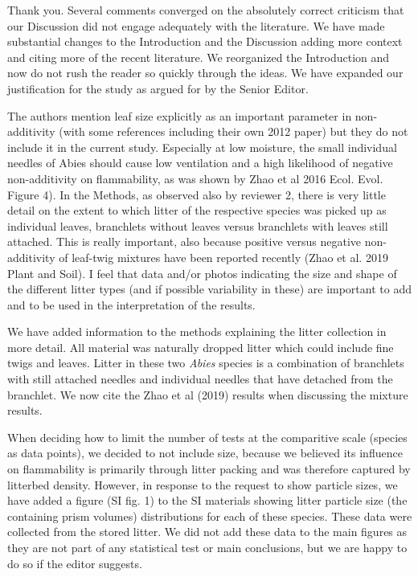 \documentclass[letterpaper, 12pt]{letter}
\begin{document}
\begin{letter}{}
Thank you. Several comments converged on the absolutely correct criticism that
our Discussion did not engage adequately with the literature. We have made
substantial changes to the Introduction and the Discussion adding more context
and citing more of the recent literature. We reorganized the Introduction and
now do not rush the reader so quickly through the ideas. We have expanded our
justification for the study as argued for by the Senior Editor.


\begin{quoting}
  The authors mention leaf size explicitly as an important parameter in
  non-additivity (with some references including their own 2012 paper) but they
  do not include it in the current study. Especially at low moisture, the small
  individual needles of Abies should cause low ventilation and a high
  likelihood of negative non-additivity on flammability, as was shown by Zhao
  et al 2016 Ecol. Evol. Figure 4). In the Methods, as observed also by
  reviewer 2, there is very little detail on the extent to which litter of the
  respective species was picked up as individual leaves, branchlets without
  leaves versus branchlets with leaves still attached. This is really
  important, also because positive versus negative non-additivity of leaf-twig
  mixtures have been reported recently (Zhao et al. 2019 Plant and Soil). I
  feel that data and/or photos indicating the size and shape of the different
  litter types (and if possible variability in these) are important to add and
  to be used in the interpretation of the results.
\end{quoting}

We have added information to the methods explaining the litter collection in
more detail. All material was naturally dropped litter which could include fine
twigs and leaves. Litter in these two \emph{Abies} species is a combination of
branchlets with still attached needles and individual needles that have
detached from the branchlet. We now cite the Zhao et al (2019) results when
discussing the mixture results.

When deciding how to limit the number of tests at the comparitive scale
(species as data points), we decided to not include size, because we believed
its influence on flammability is primarily through litter packing and was
therefore captured by litterbed density. However, in response to the request to
show particle sizes, we have added a figure (SI fig. 1) to the SI materials
showing litter particle size (the containing prism volumes) distributions for
each of these species. These data were collected from the stored litter. We did
not add these data to the main figures as they are not part of any statistical
test or main conclusions, but we are happy to do so if the editor suggests.



\end{letter}
\end{document}
